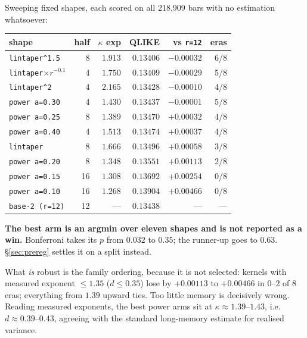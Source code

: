 \documentclass[11pt,a4paper]{article}
\begin{document}
Sweeping fixed shapes, each scored on all 218{,}909 bars with no estimation
whatsoever:

\begin{table}[h]
\centering
\begin{tabular}{lrrrrr}
\toprule
shape & half & $\kappa$ exp & QLIKE & vs \texttt{r=12} & eras \\
\midrule
\texttt{lintaper\^{}1.5}        & 8  & $1.913$ & $0.13406$ & $-0.00032$ & 6/8 \\
\texttt{lintaper}$\times r^{-0.1}$ & 4  & $1.750$ & $0.13409$ & $-0.00029$ & 5/8 \\
\texttt{lintaper\^{}2}          & 4  & $2.165$ & $0.13428$ & $-0.00010$ & 4/8 \\
\texttt{power a=0.30}           & 4  & $1.430$ & $0.13437$ & $-0.00001$ & 5/8 \\
\texttt{power a=0.25}           & 8  & $1.389$ & $0.13470$ & $+0.00032$ & 4/8 \\
\texttt{power a=0.40}           & 4  & $1.513$ & $0.13474$ & $+0.00037$ & 4/8 \\
\texttt{lintaper}               & 8  & $1.666$ & $0.13496$ & $+0.00058$ & 3/8 \\
\texttt{power a=0.20}           & 8  & $1.348$ & $0.13551$ & $+0.00113$ & 2/8 \\
\texttt{power a=0.15}           & 16 & $1.308$ & $0.13692$ & $+0.00254$ & 0/8 \\
\texttt{power a=0.10}           & 16 & $1.268$ & $0.13904$ & $+0.00466$ & 0/8 \\
\midrule
\texttt{base-2 (r=12)}          & 12 & ---     & $0.13438$ & ---        & --- \\
\bottomrule
\end{tabular}
\end{table}

\noindent
\textbf{The best arm is an argmin over eleven shapes and is not reported as a
win.} Bonferroni takes its $p$ from $0.032$ to $0.35$; the runner-up goes to
$0.63$. \S\ref{sec:prereg} settles it on a split instead.

What \emph{is} robust is the family ordering, because it is not selected:
kernels with measured exponent $\le 1.35$ ($d \le 0.35$) lose by $+0.00113$ to
$+0.00466$ in $0$--$2$ of 8 eras; everything from $1.39$ upward ties. Too
little memory is decisively wrong. Reading measured exponents, the best power
arms sit at $\kappa \approx 1.39$--$1.43$, i.e.\ $d \approx 0.39$--$0.43$,
agreeing with the standard long-memory estimate for realised variance.
\end{document}
